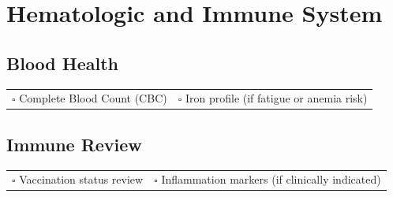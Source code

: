 
\section{Hematologic and Immune System}
\label{sec:hemato}

\subsection{Blood Health}

\begin{tabular}{p{9cm} p{8cm}}
$\square$ Complete Blood Count (CBC) & $\square$ Iron profile (if fatigue or anemia risk) \\ 
\end{tabular}

\subsection{Immune Review}

\begin{tabular}{p{9cm} p{8cm}}
$\square$ Vaccination status review & $\square$ Inflammation markers (if clinically indicated) \\ 
\end{tabular}

